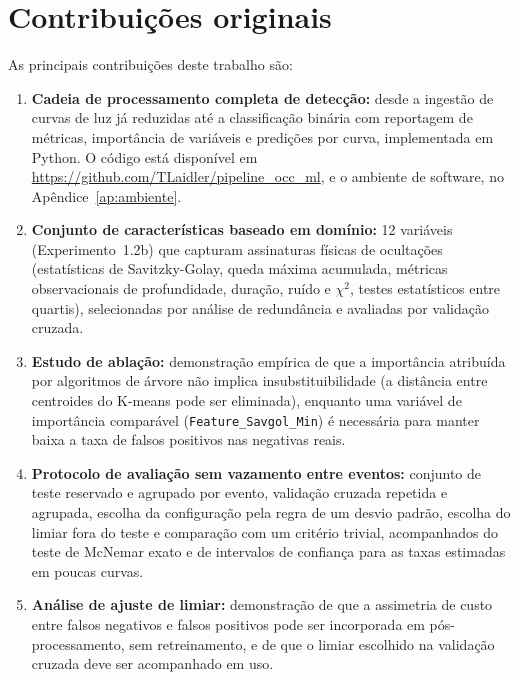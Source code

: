 \section{Contribuições originais}

As principais contribuições deste trabalho são:

\begin{enumerate}
	\item \textbf{Cadeia de processamento completa de detecção:} desde a ingestão de curvas de luz já reduzidas até a classificação binária com reportagem de métricas, importância de variáveis e predições por curva, implementada em Python. O código está disponível em \url{https://github.com/TLaidler/pipeline_occ_ml}, e o ambiente de software, no Apêndice~\ref{ap:ambiente}.

	\item \textbf{Conjunto de características baseado em domínio:} 12 variáveis (Experimento~1.2b) que capturam assinaturas físicas de ocultações (estatísticas de Savitzky-Golay, queda máxima acumulada, métricas observacionais de profundidade, duração, ruído e $\chi^2$, testes estatísticos entre quartis), selecionadas por análise de redundância e avaliadas por validação cruzada.

	\item \textbf{Estudo de ablação:} demonstração empírica de que a importância atribuída por algoritmos de árvore não implica insubstituibilidade (a distância entre centroides do K-means pode ser eliminada), enquanto uma variável de importância comparável (\texttt{Feature\_Savgol\_Min}) é necessária para manter baixa a taxa de falsos positivos nas negativas reais.

	\item \textbf{Protocolo de avaliação sem vazamento entre eventos:} conjunto de teste reservado e agrupado por evento, validação cruzada repetida e agrupada, escolha da configuração pela regra de um desvio padrão, escolha do limiar fora do teste e comparação com um critério trivial, acompanhados do teste de McNemar exato e de intervalos de confiança para as taxas estimadas em poucas curvas.

	\item \textbf{Análise de ajuste de limiar:} demonstração de que a assimetria de custo entre falsos negativos e falsos positivos pode ser incorporada em pós-processamento, sem retreinamento, e de que o limiar escolhido na validação cruzada deve ser acompanhado em uso.


\end{enumerate}

